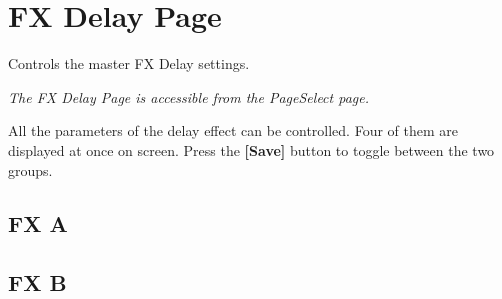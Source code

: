 \chapter{FX Delay Page}


Controls the master FX Delay settings.


\textit{The FX Delay Page is accessible from the PageSelect page.}

All the parameters of the delay effect can be controlled. Four of them are displayed at once on screen. Press the \textbf{[Save]} button to toggle between the two groups.

\section{FX A}


\section{FX B}
